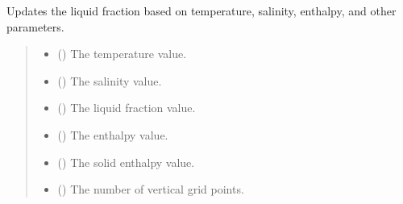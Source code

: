 \documentclass[a4paper,11pt,english,openany]{sphinxmanual}
\begin{document}
\begin{fulllineitems}
\label{\detokenize{api/spyice.update_physical_values:spyice.update_physical_values.update_liquid_fraction}}
\pysigstartsignatures
{}
\pysigstopsignatures
\sphinxAtStartPar
Updates the liquid fraction based on temperature, salinity, enthalpy, and other parameters.
\begin{quote}\begin{description}
\begin{itemize}
\item {} 
\sphinxAtStartPar
{} () \textendash{} The temperature value.

\item {} 
\sphinxAtStartPar
{} () \textendash{} The salinity value.

\item {} 
\sphinxAtStartPar
{} () \textendash{} The liquid fraction value.

\item {} 
\sphinxAtStartPar
{} () \textendash{} The enthalpy value.

\item {} 
\sphinxAtStartPar
{} () \textendash{} The solid enthalpy value.

\item {} 
\sphinxAtStartPar
{} () \textendash{} The number of vertical grid points.


\end{itemize}
\end{description}
\end{quote}
\end{fulllineitems}
\end{document}

